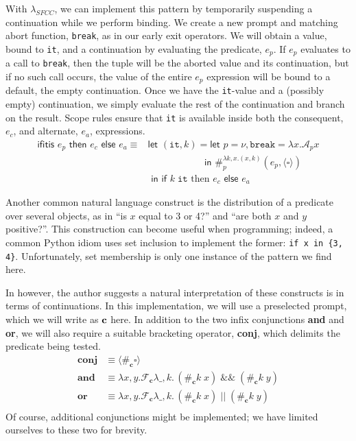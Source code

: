 \documentclass[11pt]{article}
\newcommand\x{\lambda x}
\newcommand{\letin}[2]{\textsf{let }#1\textsf{ in }#2}
\newcommand\F{\mathcal{F}}
\newcommand\A{\mathcal{A}}
\newcommand{\angles}[1]{\langle#1\rangle}
\begin{document}
With $\lambda_{SFCC}$, we can implement this pattern by temporarily suspending a continuation while we perform binding.
We create a new prompt and matching abort function, \texttt{break}, as in our early exit operators.
We will obtain a value, bound to \texttt{it}, and a continuation by evaluating the predicate, $e_p$.
If $e_p$ evaluates to a call to \texttt{break}, then the tuple will be the aborted value and its continuation, but if no such call occurs, the value of the entire $e_p$ expression will be bound to a default, the empty continuation.
Once we have the \texttt{it}-value and a (possibly empty) continuation, we simply evaluate the rest of the continuation and branch on the result.
Scope rules ensure that \texttt{it} is available inside both the consequent, $e_c$, and alternate, $e_a$, expressions.
\begin{align*}
\textsf{ifitis }e_p\textsf{ then }e_c\textsf{ else }e_a \equiv{}
	&\letin{(\texttt{it}, k) = \letin{p = \nu, \texttt{break} = \x.\A_px
	\\&\qquad\qquad\quad\;\;}{\#_p^{\lambda k,x.(x,k)}(e_p, \angles{\square})}
	\\&}{\textsf{if }k\;\texttt{it}\text{ then }e_c\textsf{ else }e_a}
\end{align*}

Another common natural language construct is the distribution of a predicate over several objects, as in ``is $x$ equal to 3 or 4?'' and ``are both $x$ and $y$ positive?''.
This construction can become useful when programming;
indeed, a common Python idiom uses set inclusion to implement the former: \texttt{if x in \{3, 4\}}.
Unfortunately, set membership is only one instance of the pattern we find here.

In \cite{ContInNatlang} however, the author suggests a natural interpretation of these constructs is in terms of continuations.
In this implementation, we will use a preselected prompt, which we will write as $\textbf c$ here.
In addition to the two infix conjunctions \textbf{and} and \textbf{or}, we will also require a suitable bracketing operator, \textbf{conj}, which delimits the predicate being tested.
\begin{align*}
\textbf{conj} &\equiv \angles{\#_\textbf{c}\square} \\
\textbf{and} &\equiv \x,y. \F_\textbf{c}\lambda \_, k.\,(\#_\textbf{c}k\;x)\;\&\&\;(\#_\textbf{c}k\;y) \\
\textbf{or} &\equiv \x,y. \F_\textbf{c}\lambda \_, k.\,(\#_\textbf{c}k\;x)\;||\;(\#_\textbf{c}k\;y) \\
\end{align*}
Of course, additional conjunctions might be implemented; we have limited ourselves to these two for brevity.
\end{document}
